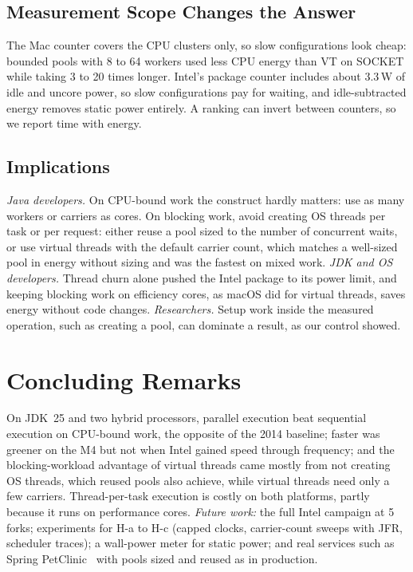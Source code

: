 \subsection{Measurement Scope Changes the Answer}
The Mac counter covers the CPU clusters only, so slow configurations look cheap: bounded pools with 8 to 64 workers used less CPU energy than VT on SOCKET while taking 3 to 20 times longer. Intel's package counter includes about 3.3\,W of idle and uncore power, so slow configurations pay for waiting, and idle-subtracted energy removes static power entirely. A ranking can invert between counters, so we report time with energy.

\subsection{Implications}
\emph{Java developers.} On CPU-bound work the construct hardly matters: use as many workers or carriers as cores. On blocking work, avoid creating OS threads per task or per request: either reuse a pool sized to the number of concurrent waits, or use virtual threads with the default carrier count, which matches a well-sized pool in energy without sizing and was the fastest on mixed work. \emph{JDK and OS developers.} Thread churn alone pushed the Intel package to its power limit, and keeping blocking work on efficiency cores, as macOS did for virtual threads, saves energy without code changes. \emph{Researchers.} Setup work inside the measured operation, such as creating a pool, can dominate a result, as our control showed.

\section{Concluding Remarks}\label{sec:conclusion}
On JDK~25 and two hybrid processors, parallel execution beat sequential execution on CPU-bound work, the opposite of the 2014 baseline; faster was greener on the M4 but not when Intel gained speed through frequency; and the blocking-workload advantage of virtual threads came mostly from not creating OS threads, which reused pools also achieve, while virtual threads need only a few carriers. Thread-per-task execution is costly on both platforms, partly because it runs on performance cores. \emph{Future work:} the full Intel campaign at 5 forks; experiments for H-a to H-c (capped clocks, carrier-count sweeps with JFR, scheduler traces); a wall-power meter for static power; and real services such as Spring PetClinic~\cite{stocker2026energyupgrades} with pools sized and reused as in production.
